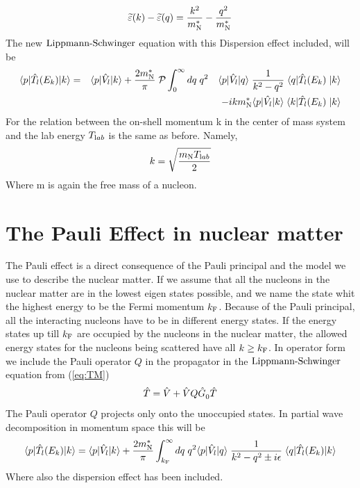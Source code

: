 \begin{eqnarray}\label{eq:inmediumeps3}
\widetilde{\varepsilon}(k)-\widetilde{\varepsilon}(q)=\frac{k^2}{m^*_{{\text N}}}-\frac{q^2}{m^*_{{\text N}}}
\end{eqnarray}
The new $\text{Lippmann-Schwinger}$ equation with this Dispersion effect included, will be
\begin{eqnarray}\label{eq:Trelllllnoererw}
\braketm{{ p}} {\op{T}_l(E_{ k})}{{ k}}&=&\braketm{{ p}}{\op{V}_l}{{ k}}
+ \frac{2m^*_{{\text N}}}{\pi}\;{\cal P}\int^{\infty}_{0}d { q}\; q^2 \quad\bra{{ p}}\op{V}_l\ket{{ q}}
\;\inv{{ k^2}-{ q^2}}   \;\bra{{ q}} \op{T}_l(E_{ k})\;\ket{{ k}}\nonumber\\
&&
-i { k}m^*_{{\text N}} \bra{{ p}}\op{V_l}\ket{{ k}}
\;\bra{{ k}}\op{T}_l(E_{ k})\;\ket{{ k}}
\end{eqnarray}
For the relation between the on-shell momentum k in the center of mass system and the lab energy $T_{{\text lab}}$
is the same as before. Namely,
\begin{eqnarray}
k=\sqrt{\frac{m_{{\text N}}T_{{\text lab}}}{2}}
\end{eqnarray}
Where m is again the free mass of a nucleon.




\section{The Pauli Effect in nuclear matter}
The Pauli effect is a direct consequence of the Pauli principal and the model we use to describe the nuclear matter.
If we assume that all the nucleons in the nuclear matter are in the lowest eigen states possible, and we name
the state whit the highest energy to be the Fermi momentum $k_{{\text F}}$. Because of the
Pauli principal, all the interacting nucleons have to be in different energy states. If the energy states up till
$k_{{\text F}}$ are occupied by the nucleons in the nuclear matter, the allowed energy states for
the nucleons being scattered have all $k\ge k_{{\text F}}$. In operator form we include the Pauli operator $Q$
in the propagator in the $\text{Lippmann-Schwinger}$ equation from   (\ref{eq:TM}) 
\begin{equation}\label{eq:TM22222}
\op{T}=\op{V}+\op{V}Q\op{G}^{}_0\op{T}
\end{equation}
The Pauli operator $Q$ projects only onto the unoccupied states. In partial wave decomposition in
momentum space this will be
\begin{equation}\label{eq:Trelllllinmed}
\braketm{{ p}} {\op{T}_l(E_{ k})}{{ k}}=\braketm{{ p}}{\op{V}_l}{{ k}}
+ \frac{2m^*_{{\text N}}}{\pi}%
\int^{\infty}_{k_{{\text F}}}d { q}\; q^2\bra{{ p}}\op{V}_l\ket{{ q}}
\;\inv{{k^2}-q^2\pm i\epsilon}   \;\bra{{ q}} \op{T}_l(E_{ k})\ket{{ k}}
\end{equation}
Where also the dispersion effect has been included.





